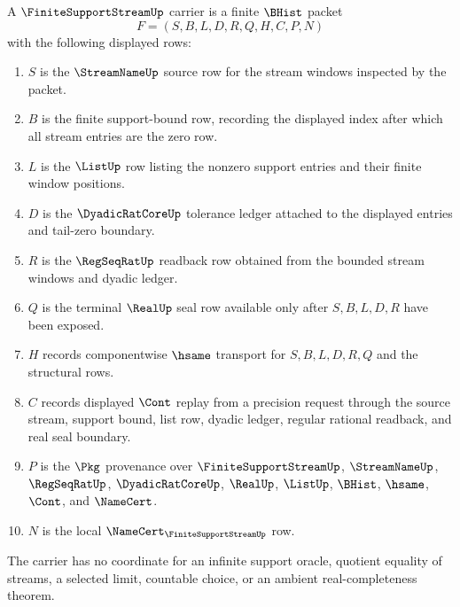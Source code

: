 \begin{definition}
\label{def:finite-support-stream-carrier}
A $\FiniteSupportStreamUp$ carrier is a finite $\BHist$ packet
$$
F=(S,B,L,D,R,Q,H,C,P,N)
$$
with the following displayed rows:
\begin{enumerate}
\item $S$ is the $\StreamNameUp$ source row for the stream windows inspected by the packet.
\item $B$ is the finite support-bound row, recording the displayed index after which all stream entries are the zero row.
\item $L$ is the $\ListUp$ row listing the nonzero support entries and their finite window positions.
\item $D$ is the $\DyadicRatCoreUp$ tolerance ledger attached to the displayed entries and tail-zero boundary.
\item $R$ is the $\RegSeqRatUp$ readback row obtained from the bounded stream windows and dyadic ledger.
\item $Q$ is the terminal $\RealUp$ seal row available only after $S,B,L,D,R$ have been exposed.
\item $H$ records componentwise $\hsame$ transport for $S,B,L,D,R,Q$ and the structural rows.
\item $C$ records displayed $\Cont$ replay from a precision request through the source stream, support bound, list row, dyadic ledger, regular rational readback, and real seal boundary.
\item $P$ is the $\Pkg$ provenance over $\FiniteSupportStreamUp$, $\StreamNameUp$, $\RegSeqRatUp$, $\DyadicRatCoreUp$, $\RealUp$, $\ListUp$, $\BHist$, $\hsame$, $\Cont$, and $\NameCert$.
\item $N$ is the local $\NameCert_{\FiniteSupportStreamUp}$ row.
\end{enumerate}
The carrier has no coordinate for an infinite support oracle, quotient equality of streams, a selected limit, countable choice, or an ambient real-completeness theorem.
\end{definition}

